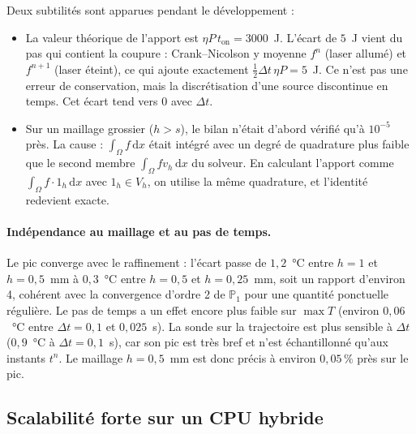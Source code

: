 \documentclass[11pt,a4paper]{article}
\newcommand{\dd}{\,\mathrm{d}}
\begin{document}
Deux subtilités sont apparues pendant le développement :
\begin{itemize}
  \item La valeur théorique de l'apport est $\eta P\, t_{\text{on}} = 3000$~J. L'écart de $5$~J vient du
        pas qui contient la coupure : Crank--Nicolson y moyenne $f^{n}$ (laser allumé) et $f^{n+1}$
        (laser éteint), ce qui ajoute exactement $\frac12\Delta t\,\eta P = 5$~J. Ce n'est pas une
        erreur de conservation, mais la discrétisation d'une source discontinue en temps. Cet écart tend
        vers $0$ avec $\Delta t$.
  \item Sur un maillage grossier ($h > s$), le bilan n'était d'abord vérifié qu'à $10^{-5}$ près. La cause :
        $\int_\Omega f\dd x$ était intégré avec un degré de quadrature plus faible que le second membre
        $\int_\Omega f v_h\dd x$ du solveur. En calculant l'apport comme $\int_\Omega f\cdot 1_h\dd x$
        avec $1_h\in V_h$, on utilise la même quadrature, et l'identité redevient exacte.
\end{itemize}

\paragraph{Indépendance au maillage et au pas de temps.}
\begin{table}[H]
  \centering\small
  \TabLaserConv
  \caption{Sensibilité du pic de température aux paramètres de discrétisation (référence : $h=0{,}25$~mm, $\Delta t = 0{,}05$~s).}
  \label{tab:laserconv}
\end{table}
Le pic converge avec le raffinement : l'écart passe de $1{,}2$~\si{\celsius} entre $h=1$ et
$h=0{,}5$~mm à $0{,}3$~\si{\celsius} entre $h=0{,}5$ et $h=0{,}25$~mm, soit un rapport d'environ 4,
cohérent avec la convergence d'ordre 2 de $\mathbb{P}_1$ pour une quantité ponctuelle régulière. Le
pas de temps a un effet encore plus faible sur $\max T$ (environ $0{,}06$~\si{\celsius} entre
$\Delta t = 0{,}1$ et $0{,}025$~s). La sonde sur la trajectoire est plus sensible à $\Delta t$
($0{,}9$~\si{\celsius} à $\Delta t=0{,}1$~s), car son pic est très bref et n'est échantillonné qu'aux
instants $t^n$. Le maillage $h=0{,}5$~mm est donc précis à environ $0{,}05\,\%$ près sur le pic.

\subsection{Scalabilité forte sur un CPU hybride}\label{sec:scaling}
\end{document}
